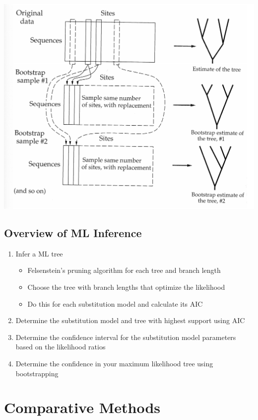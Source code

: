 \documentclass{article}
\begin{document}
\begin{multicols*}{3}
\begin{center}
    \includegraphics[width=1\linewidth, angle=0.6]{bootstrapping.png}
\end{center}

\subsection{Overview of ML Inference}

\begin{enumerate}
    \item Infer a ML tree 
    \begin{itemize}
        \item Felsenstein's pruning algorithm for each tree and branch length
        \item Choose the tree with branch lengths that optimize the likelihood
        \item Do this for each substitution model and calculate its AIC
    \end{itemize}
    \item Determine the substitution model and tree with highest support using AIC
    \item Determine the confidence interval for the substitution model parameters based on the likelihood ratios
    \item Determine the confidence in your maximum likelihood tree using bootstrapping
\end{enumerate}

\section{Comparative Methods}


\end{multicols*}
\end{document}
